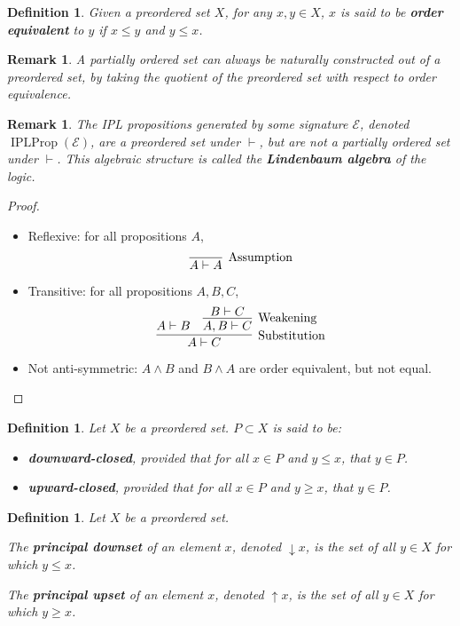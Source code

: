 \documentclass[12pt]{article}
\newtheorem{definition}[theorem]{Definition}
\newtheorem{remark}[theorem]{Remark}
\begin{document}
\begin{definition}
Given a preordered set $X$, for any $x, y \in X$, $x$ is said to be \textbf{order equivalent} to $y$ if $x \leq y$ and $y \leq x$.
\end{definition}

\begin{remark}
A partially ordered set can always be naturally constructed out of a preordered set, by taking the quotient of the preordered set with respect to order equivalence.
\end{remark}

\begin{remark}
The IPL propositions generated by some signature $\mathcal{E}$, denoted $\operatorname{IPLProp}(\mathcal{E})$, are a preordered set under $\vdash$, but are not a partially ordered set under $\vdash$. This algebraic structure is called the \textbf{Lindenbaum algebra} of the logic.
\end{remark}

\begin{proof}~
\begin{itemize}
    \item Reflexive: for all propositions $A$,
    \[
    \infer[\text{Assumption}]{A \vdash A}{}
    \]
    \item Transitive: for all propositions $A, B, C$,
    \[
    \infer[\text{Substitution}]{A \vdash C}{
    A \vdash B & \infer[\text{Weakening}]{A,B \vdash C}{B \vdash C}
    }
    \]
    \item Not anti-symmetric: $A \land B$ and $B \land A$ are order equivalent, but not equal.
\end{itemize}
\end{proof}

\begin{definition}
Let $X$ be a preordered set. $P \subset X$ is said to be:
\begin{itemize}
    \item \textbf{downward-closed}, provided that for all $x \in P$ and $y \leq x$, that $y \in P$.
    \item \textbf{upward-closed}, provided that for all $x \in P$ and $y \geq x$, that $y \in P$.
\end{itemize}
\end{definition}

\begin{definition}
Let $X$ be a preordered set.

The \textbf{principal downset} of an element $x$, denoted $\downarrow x$, is the set of all $y \in X$ for which $y \leq x$.

The \textbf{principal upset} of an element $x$, denoted $\uparrow x$, is the set of all $y \in X$ for which $y \geq x$.
\end{definition}
\end{document}
